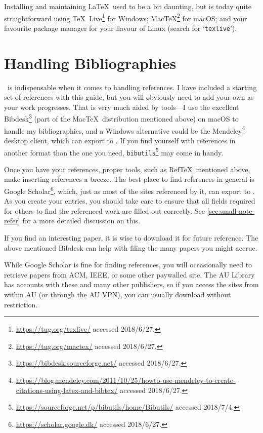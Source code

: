 Installing and maintaining \LaTeX\ used to be a bit daunting, but is today quite straightforward using \TeX\ Live\footnote{\url{https://tug.org/texlive/} accessed 2018/6/27.} for Windows; Mac\negthinspace\TeX\footnote{\url{https://tug.org/mactex/} accessed 2018/6/27.} for mac\-OS; and your favourite package manager for your flavour of Linux (search for `\texttt{texlive}').

\section*{Handling Bibliographies}
\label{sec:handl-bibl}

\mBibTeX\ is indispensable when it comes to handling references.
I have included a starting set of references with this guide, but you will obviously need to add your own as your work progresses.  That is very much aided by tools---I use the excellent Bibdesk\footnote{\url{https://bibdesk.sourceforge.net/} accessed   2018/6/27.} (part of the Mac\negthinspace\TeX\ distribution mentioned above) on macOS to handle my bibliographies, and a Windows alternative could be the Mendeley\footnote{\url{https://blog.mendeley.com/2011/10/25/howto-use-mendeley-to-create-citations-using-latex-and-bibtex/}   accessed 2018/6/27.}  desktop client, which can export to \mBibTeX.
If you find yourself with references in another format than the one you need, \texttt{bibutils}\footnote{\url{https://sourceforge.net/p/bibutils/home/Bibutils/}   accessed 2018/7/4.} may come in handy.

Once you have your references, proper tools, such as Ref\TeX\ mentioned above, make inserting references a breeze.
The best place to find references in general is Google Scholar\footnote{\url{https://scholar.google.dk/} accessed 2018/6/27.}, which, just as most of the sites referenced by it, can export to \mBibTeX.
As you create your entries, you should take care to ensure that all fields required for others to find the referenced work are filled out correctly.
See \autoref{sec:small-note-refer} for a more detailed discussion on this.

If you find an interesting paper, it is wise to download it for future reference. The above mentioned Bibdesk can help with filing the many papers you might accrue. 

While Google Scholar is fine for finding references, you will occasionally need to retrieve papers from ACM, IEEE, or some other paywalled site.
The AU Library has accounts with these and many other publishers, so if you access the sites from within AU (or through the AU VPN), you can usually download without restriction.

